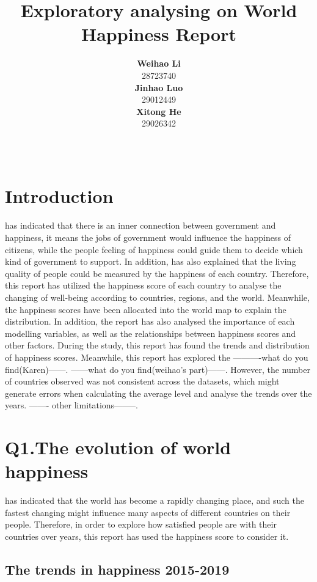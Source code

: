 \documentclass[11pt,a4paper,]{article}
\title{Exploratory analysing on World Happiness Report}
\author{\sf\Large\textbf{ Weihao Li}\\ {\sf\large 28723740\\[0.5cm]} \sf\Large\textbf{ Jinhao Luo}\\ {\sf\large 29012449\\[0.5cm]} \sf\Large\textbf{ Xitong He}\\ {\sf\large 29026342\\[0.5cm]}}
\date{\sf\Date~\Month~\Year}
\makeatletter
\def\titlepage{\front{\expandafter{\@title}}{\@author}{\@organization}}
\makeatother
\begin{document}
\titlepage

\clearpage

\hypertarget{introduction}{%
\section{Introduction}\label{introduction}}

\textcite{helliwell2019world} has indicated that there is an inner connection between government and happiness, it means the jobs of government would influence the happiness of citizens, while the people feeling of happiness could guide them to decide which kind of government to support. In addition, \textcite{helliwell2019world} has also explained that the living quality of people could be measured by the happiness of each country. Therefore, this report has utilized the happiness score of each country to analyse the changing of well-being according to countries, regions, and the world. Meanwhile, the happiness scores have been allocated into the world map to explain the distribution. In addition, the report has also analysed the importance of each modelling variables, as well as the relationships between happiness scores and other factors. During the study, this report has found the trends and distribution of happiness scores. Meanwhile, this report has explored the ----------what do you find(Karen)------. ------what do you find(weihao's part)------. However, the number of countries observed was not consistent across the datasets, which might generate errors when calculating the average level and analyse the trends over the years. ------- other limitations--------.

\clearpage

\hypertarget{q1.the-evolution-of-world-happiness}{%
\section{Q1.The evolution of world happiness}\label{q1.the-evolution-of-world-happiness}}

\textcite{helliwell2019world} has indicated that the world has become a rapidly changing place, and such the fastest changing might influence many aspects of different countries on their people. Therefore, in order to explore how satisfied people are with their countries over years, this report has used the happiness score to consider it.

\hypertarget{the-trends-in-happiness-2015-2019}{%
\subsection{The trends in happiness 2015-2019}\label{the-trends-in-happiness-2015-2019}}
\end{document}
